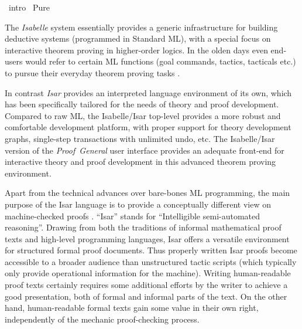 %
\begin{isabellebody}%
\def\isabellecontext{intro}%
%
\isadelimtheory
\isanewline
\isanewline
%
\endisadelimtheory
%
\isatagtheory
{}\isamarkupfalse%
\ intro\isanewline
{}\ Pure\isanewline
{}%
\endisatagtheory
{\isafoldtheory}%
%
\isadelimtheory
%
\endisadelimtheory
%
\isamarkuptrue%
%
\isamarkuptrue%
%
\begin{isamarkuptext}%
The \emph{Isabelle} system essentially provides a generic
  infrastructure for building deductive systems (programmed in
  Standard ML), with a special focus on interactive theorem proving in
  higher-order logics.  In the olden days even end-users would refer
  to certain ML functions (goal commands, tactics, tacticals etc.) to
  pursue their everyday theorem proving tasks
  \cite{isabelle-intro,isabelle-ref}.
  
  In contrast \emph{Isar} provides an interpreted language environment
  of its own, which has been specifically tailored for the needs of
  theory and proof development.  Compared to raw ML, the Isabelle/Isar
  top-level provides a more robust and comfortable development
  platform, with proper support for theory development graphs,
  single-step transactions with unlimited undo, etc.  The
  Isabelle/Isar version of the \emph{Proof~General} user interface
  \cite{proofgeneral,Aspinall:TACAS:2000} provides an adequate
  front-end for interactive theory and proof development in this
  advanced theorem proving environment.

  \medskip Apart from the technical advances over bare-bones ML
  programming, the main purpose of the Isar language is to provide a
  conceptually different view on machine-checked proofs
  \cite{Wenzel:1999:TPHOL,Wenzel-PhD}.  ``Isar'' stands for
  ``Intelligible semi-automated reasoning''.  Drawing from both the
  traditions of informal mathematical proof texts and high-level
  programming languages, Isar offers a versatile environment for
  structured formal proof documents.  Thus properly written Isar
  proofs become accessible to a broader audience than unstructured
  tactic scripts (which typically only provide operational information
  for the machine).  Writing human-readable proof texts certainly
  requires some additional efforts by the writer to achieve a good
  presentation, both of formal and informal parts of the text.  On the
  other hand, human-readable formal texts gain some value in their own
  right, independently of the mechanic proof-checking process.


\end{isamarkuptext}
\end{isabellebody}
